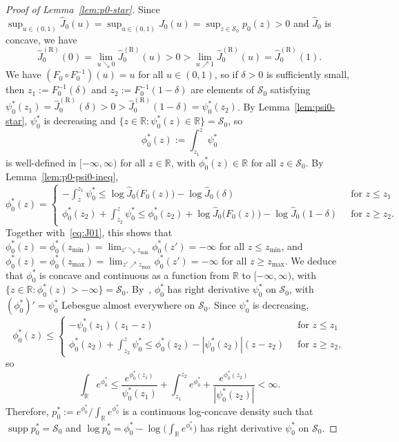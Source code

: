 \documentclass[a4paper]{article}
\newcommand{\R}{\mathbb{R}}
\DeclareMathOperator{\supp}{supp}
\theoremstyle{definition}
\begin{document}
\begin{proof}[Proof of Lemma~\ref{lem:p0-star}]
Since $\sup_{u \in (0,1)}\hat{J}_0(u) = \sup_{u \in (0,1)}J_0(u) = \sup_{z \in \mathcal{S}_0}p_0(z) > 0$ and $\hat{J}_0$ is concave, we have
\[
\hat{J}_0^{(\mathrm{R})}(0) = \lim_{u \searrow 0}\hat{J}_0^{(\mathrm{R})}(u) > 0 > \lim_{u \nearrow 1}\hat{J}_0^{(\mathrm{R})}(u) = \hat{J}_0^{(\mathrm{R})}(1).
\]
We have $(F_0 \circ F_0^{-1})(u) = u$ for all $u \in (0,1)$, so if $\delta > 0$ is sufficiently small, then $z_1 := F_0^{-1}(\delta)$ and $z_2 := F_0^{-1}(1 - \delta)$ are elements of $\mathcal{S}_0$ satisfying $\psi_0^*(z_1) = \hat{J}_0^{(\mathrm{R})}(\delta) > 0 > \hat{J}_0^{(\mathrm{R})}(1 - \delta) = \psi_0^*(z_2)$. By Lemma~\ref{lem:psi0-star}, $\psi_0^*$ is decreasing and $\{z \in \R : \psi_0^*(z) \in \R\} = \mathcal{S}_0$, so
\[
\phi_0^*(z) := \int_{z_1}^z\psi_0^*
\]
is well-defined in $[-\infty,\infty)$ for all $z \in\R$, with $\phi_0^*(z) \in \R$ for all $z \in \mathcal{S}_0$. By Lemma~\ref{lem:p0-psi0-ineq},
\[
\phi_0^*(z) =
\begin{cases}
-\int_z^{z_1}\psi_0^* \leq \log\hat{J}_0\bigl(F_0(z)\bigr) - \log\hat{J}_0(\delta) \;\;&\text{for }z \leq z_1 \\
\phi_0^*(z_2) + \int_{z_2}^z \psi_0^* \leq \phi_0^*(z_2) + \log\hat{J}_0\bigl(F_0(z)\bigr) - \log\hat{J}_0(1 - \delta) \;\;&\text{for }z \geq z_2.
\end{cases}
\]
Together with~\eqref{eq:J01}, this shows that $\phi_0^*(z) = \phi_0^*(z_{\min}) = \lim_{z' \searrow z_{\min}}\phi_0^*(z') = -\infty$ for all $z \leq z_{\min}$, and $\phi_0^*(z) = \phi_0^*(z_{\max}) = \lim_{z' \nearrow z_{\max}}\phi_0^*(z') = -\infty$ for all $z \geq z_{\max}$. We deduce that $\phi_0^*$ is concave and continuous as a function from $\R$ to $[-\infty,\infty)$, with $\{z \in \R : \phi_0^*(z) > -\infty\} = \mathcal{S}_0$.
By~\citet[Theorem~24.2]{rockafellar97convex}, $\phi_0^*$ has right derivative $\psi_0^*$ on $\mathcal{S}_0$, with $(\phi_0^*)' = \psi_0^*$ Lebesgue almost everywhere on $\mathcal{S}_0$. Since $\psi_0^*$ is decreasing,
\[
\phi_0^*(z) \leq
\begin{cases}
-\psi_0^*(z_1)(z_1 - z)&\;\;\text{for }z \leq z_1 \\ 
\phi_0^*(z_2) + \int_{z_2}^z \psi_0^* \leq \phi_0^*(z_2) - |\psi_0^*(z_2)|(z - z_2)&\;\;\text{for }z \geq z_2,
\end{cases}
\]
so 
\[
\int_\R e^{\phi_0^*} \leq \frac{e^{\phi_0^*(z_1)}}{\psi_0^*(z_1)} + \int_{z_1}^{z_2}e^{\phi_0^*} + \frac{e^{\phi_0^*(z_2)}}{|\psi_0^*(z_2)|} < \infty.
\]
Therefore, $p_0^* := e^{\phi_0^*}/\int_\R e^{\phi_0^*}$ is a continuous log-concave density such that $\supp p_0^* = \mathcal{S}_0$ and $\log p_0^* = \phi_0^* - \log\bigl(\int_{\mathbb{R}} e^{\phi_0^*}\bigr)$ has right derivative $\psi_0^*$ on $\mathcal{S}_0$.


\end{proof}
\end{document}
